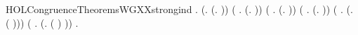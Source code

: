 \begin{SaveVerbatim}{HOLCongruenceTheoremsWGXXstrongind}
\HOLTokenTurnstile{} \HOLSymConst{\HOLTokenForall{}}.
       (\HOLSymConst{\HOLTokenForall{}}.  (\HOLTokenLambda{}. )) \HOLSymConst{\HOLTokenConj{}}
       (\HOLSymConst{\HOLTokenForall{}} .   \HOLSymConst{\HOLTokenImp{}}  (\HOLTokenLambda{}.  )) \HOLSymConst{\HOLTokenConj{}}
       (\HOLSymConst{\HOLTokenForall{}} .
              \HOLSymConst{\HOLTokenConj{}}   \HOLSymConst{\HOLTokenConj{}}   \HOLSymConst{\HOLTokenConj{}}   \HOLSymConst{\HOLTokenImp{}}
             (\HOLTokenLambda{}.   \HOLSymConst{+}  )) \HOLSymConst{\HOLTokenConj{}}
       (\HOLSymConst{\HOLTokenForall{}} .
              \HOLSymConst{\HOLTokenConj{}}   \HOLSymConst{\HOLTokenConj{}}   \HOLSymConst{\HOLTokenConj{}}   \HOLSymConst{\HOLTokenImp{}}
             (\HOLTokenLambda{}.   \HOLSymConst{\ensuremath{\parallel}}  )) \HOLSymConst{\HOLTokenConj{}}
       (\HOLSymConst{\HOLTokenForall{}} .   \HOLSymConst{\HOLTokenConj{}}   \HOLSymConst{\HOLTokenImp{}}  (\HOLTokenLambda{}. \HOLConst{\ensuremath{\nu}}  ( ))) \HOLSymConst{\HOLTokenConj{}}
       (\HOLSymConst{\HOLTokenForall{}} .   \HOLSymConst{\HOLTokenConj{}}   \HOLSymConst{\HOLTokenImp{}}  (\HOLTokenLambda{}.  ( ) )) \HOLSymConst{\HOLTokenImp{}}
       \HOLSymConst{\HOLTokenForall{}}.   \HOLSymConst{\HOLTokenImp{}}  
\end{SaveVerbatim}
